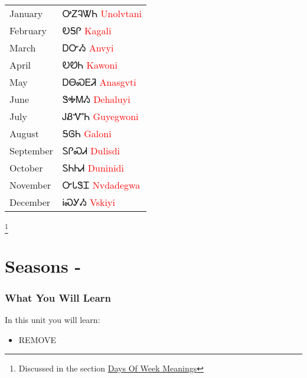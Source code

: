 \begin{minipage}{\linewidth}
\begin{tabular}{p{3cm} p{11cm}}
January & ᎤᏃᎸᏔᏂ 
 \newline \textcolor{red}{Unolvtani}\\
February & ᎧᎦᎵ 
 \newline \textcolor{red}{Kagali}\\
March & ᎠᏅᏱ 
 \newline \textcolor{red}{Anvyi}\\
April & ᎧᏬᏂ 
 \newline \textcolor{red}{Kawoni}\\
May & ᎠᎾᏍᎬᏘ 
 \newline \textcolor{red}{Anasgvti}\\
June & ᏕᎭᎷᏱ 
 \newline \textcolor{red}{Dehaluyi}\\
July & ᎫᏰᏉᏂ 
 \newline \textcolor{red}{Guyegwoni}\\
August & ᎦᎶᏂ 
 \newline \textcolor{red}{Galoni}\\
September & ᏚᎵᏍᏗ 
 \newline \textcolor{red}{Dulisdi}\\
October & ᏚᏂᏂᏗ 
 \newline \textcolor{red}{Duninidi}\\
November & ᏅᏓᏕᏆ 
 \newline \textcolor{red}{Nvdadegwa}\\
December & ᎥᏍᎩᏱ 
 \newline \textcolor{red}{Vskiyi}\\
\end{tabular}
\end{minipage}

\footnote{Discussed in the section \hyperref[sec:daysOfWeekMeaning]{Days Of Week Meanings}}
\index{}
\chapter{Seasons - }
\subsection{What You Will Learn}
In this unit you will learn:
\begin{itemize}
\item REMOVE
\end{itemize}\newpage

